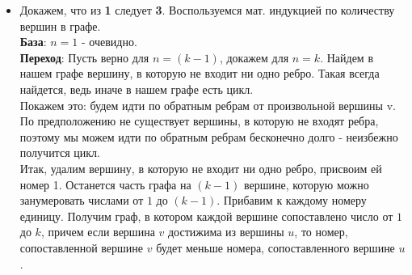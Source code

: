 \begin{itemize}
\begin{itemize}
    \item Докажем, что из \textbf{1} следует \textbf{3}. Воспользуемся мат. индукцией по количеству вершин в графе. \\
    \textbf{База}: $n = 1$ - очевидно. \\
    \textbf{Переход}: Пусть верно для $n = (k - 1)$, докажем для $n = k$. Найдем в нашем графе вершину, в которую не входит ни одно ребро. Такая всегда найдется, ведь иначе в нашем графе есть цикл. \\
    Покажем это: будем идти по обратным ребрам от произвольной вершины v. По предположению не существует вершины, в которую не входят ребра, поэтому мы можем идти по обратным ребрам бесконечно долго - неизбежно получится цикл. \\
    Итак, удалим вершину, в которую не входит ни одно ребро, присвоим ей номер 1. Останется часть графа на $(k - 1)$ вершине, которую можно занумеровать числами от $1$ до $(k - 1)$. Прибавим к каждому номеру единицу. Получим граф, в котором каждой вершине сопоставлено число от $1$ до $k$, причем если вершина $v$ достижима из вершины $u$, то номер, сопоставленной вершине $v$ будет меньше номера, сопоставленного вершине $u$.

    \end{itemize}
\end{itemize}
